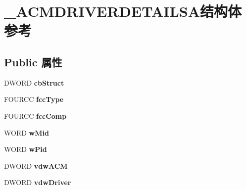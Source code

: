 \hypertarget{struct___a_c_m_d_r_i_v_e_r_d_e_t_a_i_l_s_a}{}\section{\+\_\+\+A\+C\+M\+D\+R\+I\+V\+E\+R\+D\+E\+T\+A\+I\+L\+S\+A结构体 参考}
\label{struct___a_c_m_d_r_i_v_e_r_d_e_t_a_i_l_s_a}
\subsection*{Public 属性}
\begin{DoxyCompactItemize}
\item 
\mbox{\label{struct___a_c_m_d_r_i_v_e_r_d_e_t_a_i_l_s_a_a2fa8a3a8c8c149300455dc31286d2565}} 
D\+W\+O\+RD {\bfseries cb\+Struct}
\item 
\mbox{\label{struct___a_c_m_d_r_i_v_e_r_d_e_t_a_i_l_s_a_a0bf8bc078d644b1d874bca2353cb1c22}} 
F\+O\+U\+R\+CC {\bfseries fcc\+Type}
\item 
\mbox{\label{struct___a_c_m_d_r_i_v_e_r_d_e_t_a_i_l_s_a_a8dce17e7ebe5d4dbdce6f2ba56cc234d}} 
F\+O\+U\+R\+CC {\bfseries fcc\+Comp}
\item 
\mbox{\label{struct___a_c_m_d_r_i_v_e_r_d_e_t_a_i_l_s_a_acf97a13c426de7fa49440d9e4994049f}} 
W\+O\+RD {\bfseries w\+Mid}
\item 
\mbox{\label{struct___a_c_m_d_r_i_v_e_r_d_e_t_a_i_l_s_a_a44d964fe897fd2599c67cd2e96cc0307}} 
W\+O\+RD {\bfseries w\+Pid}
\item 
\mbox{\label{struct___a_c_m_d_r_i_v_e_r_d_e_t_a_i_l_s_a_a0b3152405dcd7ed78b358e05c5ca2cc9}} 
D\+W\+O\+RD {\bfseries vdw\+A\+CM}
\item 
\mbox{\label{struct___a_c_m_d_r_i_v_e_r_d_e_t_a_i_l_s_a_a4c3aa12099b82f75e73a5310e39ad215}} 
D\+W\+O\+RD {\bfseries vdw\+Driver}
\item 

\end{DoxyCompactItemize}
